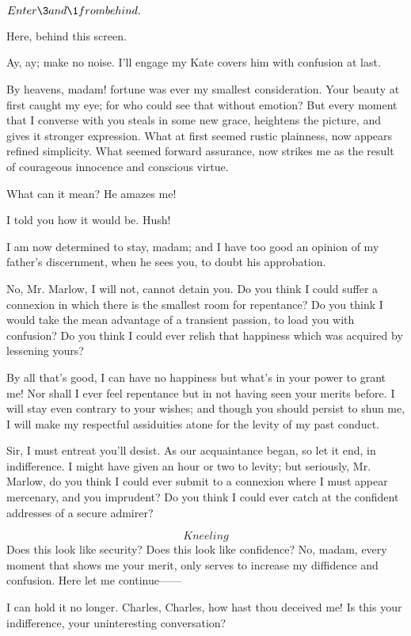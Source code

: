 \documentclass{book}
\begin{document}
\(Enter \3 and \1 from behind.\)


\1  Here, behind this screen.

\3  Ay, ay; make no noise.  I'll engage my Kate covers him
with confusion at last.

\2  By heavens, madam! fortune was ever my smallest
consideration.  Your beauty at first caught my eye; for who could see
that without emotion?  But every moment that I converse with you steals
in some new grace, heightens the picture, and gives it stronger
expression.  What at first seemed rustic plainness, now appears refined
simplicity.  What seemed forward assurance, now strikes me as the
result of courageous innocence and conscious virtue.

\1  What can it mean?  He amazes me!

\3  I told you how it would be.  Hush!

\2  I am now determined to stay, madam; and I have too good an
opinion of my father's discernment, when he sees you, to doubt his
approbation.

\8  No, Mr. Marlow, I will not, cannot detain you.  Do
you think I could suffer a connexion in which there is the smallest
room for repentance?  Do you think I would take the mean advantage of a
transient passion, to load you with confusion?  Do you think I could
ever relish that happiness which was acquired by lessening yours?

\2  By all that's good, I can have no happiness but what's in your
power to grant me!  Nor shall I ever feel repentance but in not having
seen your merits before.  I will stay even contrary to your wishes; and
though you should persist to shun me, I will make my respectful
assiduities atone for the levity of my past conduct.

\8  Sir, I must entreat you'll desist.  As our
acquaintance began, so let it end, in indifference.  I might have
given an hour or two to levity; but seriously, Mr. Marlow, do you
think I could ever submit to a connexion where I must appear
mercenary, and you imprudent?  Do you think I could ever catch at the
confident addresses of a secure admirer?

\2  \[Kneeling\]  Does this look like security?  Does this look
like confidence?  No, madam, every moment that shows me your merit,
only serves to increase my diffidence and confusion.  Here let me
continue------

\1  I can hold it no longer.  Charles, Charles, how hast thou
deceived me!  Is this your indifference, your uninteresting
conversation?
\end{document}
